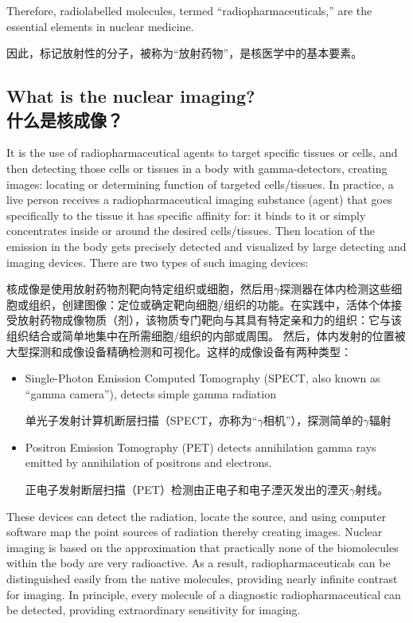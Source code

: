 \documentclass[dvipsnames, svgnames,a4paper,11pt]{article}
\begin{document}
Therefore, radiolabelled molecules, termed “radiopharmaceuticals,” are the essential elements in nuclear medicine.

因此，标记放射性的分子，被称为“放射药物”，是核医学中的基本要素。

\subsection{What is the nuclear imaging?\\什么是核成像？}

It is the use of radiopharmaceutical agents to target specific tissues or cells, and then detecting those cells or tissues in a body with gamma-detectors, creating images: locating or determining function of targeted cells/tissues.
In practice, a live person receives a radiopharmaceutical imaging substance (agent) that goes specifically to the tissue it has specific affinity for: it binds to it or simply concentrates inside or around the desired cells/tissues.  Then location of the emission in the body gets precisely detected and visualized by large detecting and imaging devices. There are two types of such imaging devices:

核成像是使用放射药物剂靶向特定组织或细胞，然后用$\gamma$探测器在体内检测这些细胞或组织，创建图像：定位或确定靶向细胞/组织的功能。在实践中，活体个体接受放射药物成像物质（剂），该物质专门靶向与其具有特定亲和力的组织：它与该组织结合或简单地集中在所需细胞/组织的内部或周围。 然后，体内发射的位置被大型探测和成像设备精确检测和可视化。这样的成像设备有两种类型：

\begin{itemize}
      \item Single-Photon Emission Computed Tomography (SPECT, also known as “gamma camera”), detects simple gamma radiation

            单光子发射计算机断层扫描（SPECT，亦称为“$\gamma$相机”），探测简单的$\gamma$辐射

      \item Positron Emission Tomography (PET) detects annihilation gamma rays emitted by annihilation of positrons and electrons.

            正电子发射断层扫描（PET）检测由正电子和电子湮灭发出的湮灭$\gamma$射线。
\end{itemize}

These devices can detect the radiation, locate the source, and using computer software map the point sources of radiation thereby creating images. Nuclear imaging is based on the approximation that practically none of the biomolecules within the body are very radioactive.  As a result, radiopharmaceuticals can be distinguished easily from the native molecules, providing nearly infinite contrast for imaging. In principle, every molecule of a diagnostic radiopharmaceutical can be detected, providing extraordinary sensitivity for imaging.
\end{document}
